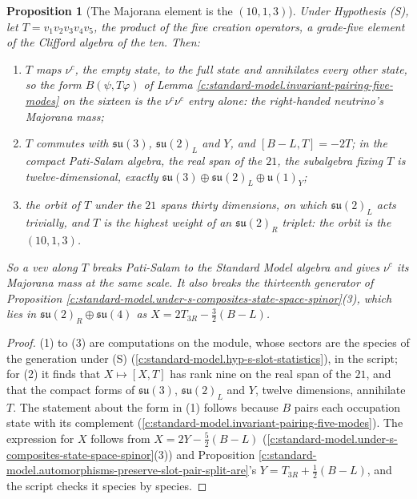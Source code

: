 \documentclass[11pt]{article}
\newtheorem{proposition}[theorem]{Proposition}
\theoremstyle{definition}
\theoremstyle{plain}
\newcommand{\changedmark}[2]{\marginpar{\raggedright\scriptsize\color{#1}#2}}
\providecommand{\su}{}\renewcommand{\su}{\mathfrak{su}}
\providecommand{\uu}{}\renewcommand{\uu}{\mathfrak{u}}
\begin{document}
\begin{proposition}[The Majorana element is the $(10,1,3)$]\label{c:standard-model.majorana-element}
\changedmark{gray}{reworded}
Under Hypothesis (S), let $T = v_{1}v_{2}v_{3}v_{4}v_{5}$, the product of the five creation operators, a grade-five element of the Clifford algebra of the ten. Then:
\begin{enumerate}
\item[(1)] $T$ maps $\nu^{c}$, the empty state, to the full state and annihilates every other state, so the form $B(\psi, T\varphi)$ of Lemma \ref{c:standard-model.invariant-pairing-five-modes} on the sixteen is the $\nu^{c}\nu^{c}$ entry alone: the right-handed neutrino's Majorana mass;
\item[(2)] $T$ commutes with $\su(3)$, $\su(2)_{L}$ and $Y$, and $[B - L, T] = -2T$; in the compact Pati-Salam algebra, the real span of the $21$, the subalgebra fixing $T$ is twelve-dimensional, exactly $\su(3) \oplus \su(2)_{L} \oplus \uu(1)_{Y}$;
\item[(3)] the orbit of $T$ under the $21$ spans thirty dimensions, on which $\su(2)_{L}$ acts trivially, and $T$ is the highest weight of an $\su(2)_{R}$ triplet: the orbit is the $(10,1,3)$.
\end{enumerate}
So a vev along $T$ breaks Pati-Salam to the Standard Model algebra and gives $\nu^{c}$ its Majorana mass at the same scale. It also breaks the thirteenth generator of Proposition \ref{c:standard-model.under-s-composites-state-space-spinor}(3), which lies in $\su(2)_{R} \oplus \su(4)$ as $X = 2T_{3R} - \tfrac32(B - L)$.
\end{proposition}
\begin{proof}
(1) to (3) are computations on the module, whose sectors are the species of the generation under (S) (\ref{c:standard-model.hyp-s-slot-statistics}), in the script; for (2) it finds that $X \mapsto [X, T]$ has rank nine on the real span of the $21$, and that the compact forms of $\su(3)$, $\su(2)_{L}$ and $Y$, twelve dimensions, annihilate $T$. The statement about the form in (1) follows because $B$ pairs each occupation state with its complement (\ref{c:standard-model.invariant-pairing-five-modes}). The expression for $X$ follows from $X = 2Y - \tfrac52(B - L)$ (\ref{c:standard-model.under-s-composites-state-space-spinor}(3)) and Proposition \ref{c:standard-model.automorphisms-preserve-slot-pair-split-are}'s $Y = T_{3R} + \tfrac12(B - L)$, and the script checks it species by species.

\end{proof}
\end{document}

